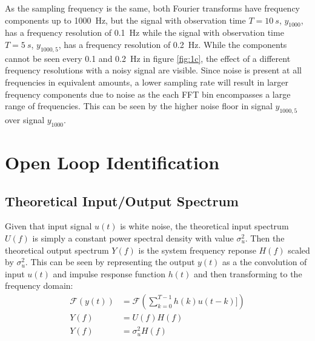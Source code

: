 \documentclass[11pt,a4paper]{article}
\begin{document}
As the sampling frequency is the same, both Fourier transforms have frequency
components up to \mbox{1000 Hz}, but the signal with observation time $T = 10
\:s$, $y_{1000}$, has a frequency resolution of \mbox{0.1 Hz} while the signal
with observation time $T = 5 \:s$, $y_{1000, 5}$, has a frequency resolution of
\mbox{0.2 Hz}. While the components cannot be seen every 0.1 and \mbox{0.2 Hz}
in figure \ref{fig:1c}, the effect of a different frequency resolutions with a
noisy signal are visible. Since noise is present at all frequencies in
equivalent amounts, a lower sampling rate will result in larger frequency
components due to noise as the each FFT bin encompasses a large range of
frequencies. This can be seen by the higher noise floor in signal $y_{1000, 5}$
over signal $y_{1000}$.

\section{Open Loop Identification}
\label{sec:2}

\subsection{Theoretical Input/Output Spectrum}
Given that input signal $u(t)$ is white noise, the theoretical input spectrum
$U(f)$ is simply a constant power spectral density with value $\sigma_u^2$.
Then the theoretical output spectrum $Y(f)$ is the system frequency reponse
$H(f)$ scaled by $\sigma_u^2$. This can be seen by representing the output
$y(t)$ as a the convolution of input $u(t)$ and impulse response function
$h(t)$ and then transforming to the frequency domain:
\begin{align*}
    \mathcal{F}(y(t)) &= \mathcal{F}(\sum_{k=0}^{T-1} h(k)u(t - k)]) \\
    Y(f) &= U(f) H(f) \\
    Y(f) &= \sigma_u^2 H(f)
\end{align*}

\end{document}
